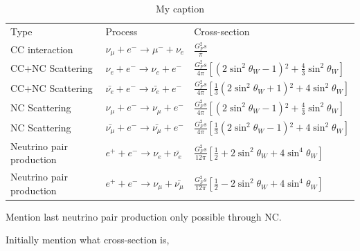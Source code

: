 \begin{table}[h!]
\centering
\caption{My caption}
\label{my-label}
\begin{tabular}{|l|l|l|}
 \hline
Type & Process & Cross-section \\
CC interaction & $\nu_\mu + e^- \rightarrow \mu^- + \nu_e$  & $\frac{G_F^2 s}{\pi}$\\
CC+NC Scattering & $\nu_e + e^- \rightarrow \nu_e + e^-$ & $\frac{G_F^2 s}{4\pi} \left[ (2\sin^2 \theta_W -1){}^2 +\frac{4}{3}\sin^2 \theta_W \right]$\\ 
CC+NC Scattering & $\bar{\nu_e} + e^- \rightarrow \bar{\nu_e} + e^-$ & $\frac{G_F^2 s}{4\pi} \left[ \frac{1}{3}(2\sin^2 \theta_W +1){}^2 +4\sin^2 \theta_W \right]$ \\
NC Scattering & $\nu_\mu + e^- \rightarrow \nu_\mu + e^-$ & $\frac{G_F^2 s}{4\pi} \left[ (2\sin^2 \theta_W -1){}^2 +\frac{4}{3}\sin^2 \theta_W \right]$ \\
NC Scattering & $\bar{\nu_\mu} + e^- \rightarrow \bar{\nu_\mu} + e^-$ &$\frac{G_F^2 s}{4\pi} \left[ \frac{1}{3}(2\sin^2 \theta_W -1){}^2 +4\sin^2 \theta_W \right]$ \\
Neutrino pair production & $e^+ + e^- \rightarrow \nu_e + \bar{\nu_e}$ & $\frac{G_F^2 s}{12\pi} \left[ \frac{1}{2} + 2\sin^2 \theta_W + 4\sin^4 \theta_W \right]$ \\
Neutrino pair production & $e^+ + e^- \rightarrow \nu_\mu + \bar{\nu_\mu}$ & $\frac{G_F^2 s}{12\pi} \left[ \frac{1}{2} - 2\sin^2 \theta_W + 4\sin^4 \theta_W \right]$ \\
 \hline
\end{tabular}
\end{table}

Mention last neutrino pair production only possible through NC.


Initially mention what cross-section is, 

